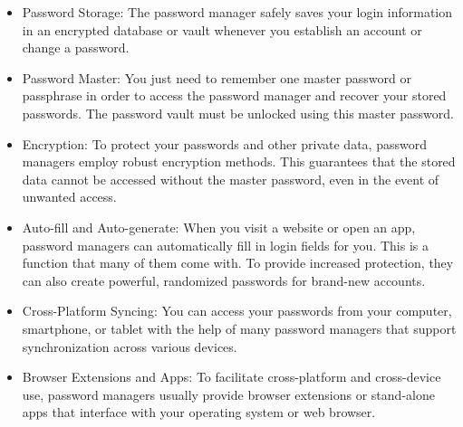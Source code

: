\documentclass[10pt,oneside,english,a4paper]{article}
\begin{document}
\begin{itemize}
\item Password Storage: The password manager safely saves your login information in an encrypted database or vault whenever you establish an account or change a password.
\item Password Master: You just need to remember one master password or passphrase in order to access the password manager and recover your stored passwords. The password vault must be unlocked using this master password.
\item Encryption: To protect your passwords and other private data, password managers employ robust encryption methods. This guarantees that the stored data cannot be accessed without the master password, even in the event of unwanted access.
\item Auto-fill and Auto-generate: When you visit a website or open an app, password managers can automatically fill in login fields for you. This is a function that many of them come with. To provide increased protection, they can also create powerful, randomized passwords for brand-new accounts.
\item Cross-Platform Syncing: You can access your passwords from your computer, smartphone, or tablet with the help of many password managers that support synchronization across various devices.
\item Browser Extensions and Apps: To facilitate cross-platform and cross-device use, password managers usually provide browser extensions or stand-alone apps that interface with your operating system or web browser.
\end{itemize}



\clearpage


\nocite{*}
\end{document}
